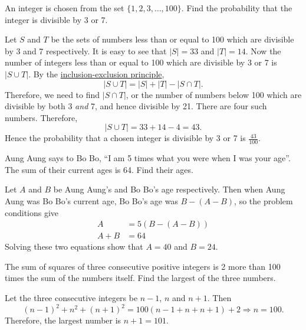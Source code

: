\begin{question}
    An integer is chosen from the set $\{1, 2, 3, \ldots, 100\}$. Find the
    probability that the integer is divisible by 3 or 7.
\end{question}
\begin{solution}
    Let $S$ and $T$ be the sets of numbers less than or equal to 100 which are
    divisible by 3 and 7 respectively. It is easy to see that $|S| = 33$ and
    $|T| = 14$. Now the number of integers less than or equal to 100 which are
    divisible by 3 or 7 is $|S \cup T|$. By the \hyperref[thm:
    incluexclu]{inclusion-exclusion principle},
    \[ |S \cup T| = |S| + |T| - |S \cap T|. \]
    Therefore, we need to find $|S \cap T|$, or the number of numbers below 100
    which are divisible by both 3 \emph{and} 7, and hence divisible by 21.
    There are four such numbers. Therefore,
    \[ |S \cup T| = 33 + 14 - 4 = 43.\]
    Hence the probability that a chosen integer is divisible by 3 or 7 is
    $\frac{43}{100}$.
\end{solution}

\begin{question}
    Aung Aung says to Bo Bo, ``I am 5 times what you were when I was your
    age''.  The sum of their current ages is 64. Find their ages.
\end{question}
\begin{solution}
    Let $A$ and $B$ be Aung Aung's and Bo Bo's age respectively. Then when Aung
    Aung was Bo Bo's current age, Bo Bo's age was $B - (A - B)$, so the problem
    conditions give
    \begin{align*}
        A &= 5(B - (A - B))\\
        A + B &= 64
    \end{align*}
    Solving these two equations show that $A = 40$ and $B = 24$.
\end{solution}

\begin{question}
    The sum of squares of three consecutive positive integers is 2 more than
    100 times the sum of the numbers itself. Find the largest of the three
    numbers.
\end{question}
\begin{solution}
    Let the three consecutive integers be $n - 1$, $n$ and $n + 1$. Then
    \[ (n - 1)^2 + n^2 + (n + 1)^2 = 100(n - 1 + n + n + 1) + 2 \Longrightarrow
    n = 100.\]
    Therefore, the largest number is $n + 1 = 101$.
\end{solution}


